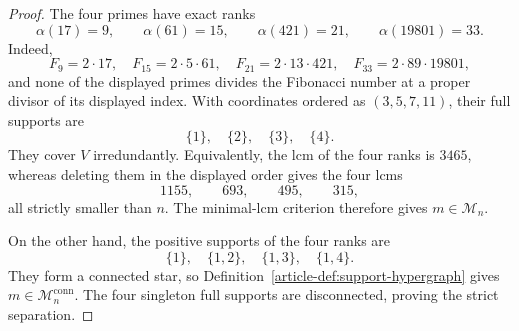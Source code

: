 \begin{proof}
The four primes have exact ranks
\[
 \alpha(17)=9,\qquad \alpha(61)=15,\qquad
 \alpha(421)=21,\qquad \alpha(19801)=33.
\]
Indeed,
\[
 F_9=2\cdot17,\quad F_{15}=2\cdot5\cdot61,\quad
 F_{21}=2\cdot13\cdot421,\quad
 F_{33}=2\cdot89\cdot19801,
\]
and none of the displayed primes divides the Fibonacci number at a proper
divisor of its displayed index.  With coordinates ordered as $(3,5,7,11)$,
their full supports are
\[
 \{1\},\quad\{2\},\quad\{3\},\quad\{4\}.
\]
They cover $V$ irredundantly.  Equivalently, the lcm of the four ranks is
$3465$, whereas deleting them in the displayed order gives the four lcms
\[
 1155,\qquad693,\qquad495,\qquad315,
\]
all strictly smaller than $n$.  The minimal-lcm criterion therefore gives
$m\in\mathcal M_n$.

On the other hand, the positive supports of the four ranks are
\[
 \{1\},\quad\{1,2\},\quad\{1,3\},\quad\{1,4\}.
\]
They form a connected star, so Definition~\ref{article-def:support-hypergraph}
gives $m\in\mathcal M_n^{\mathrm{conn}}$.  The four singleton full supports
are disconnected, proving the strict separation.
\end{proof}

